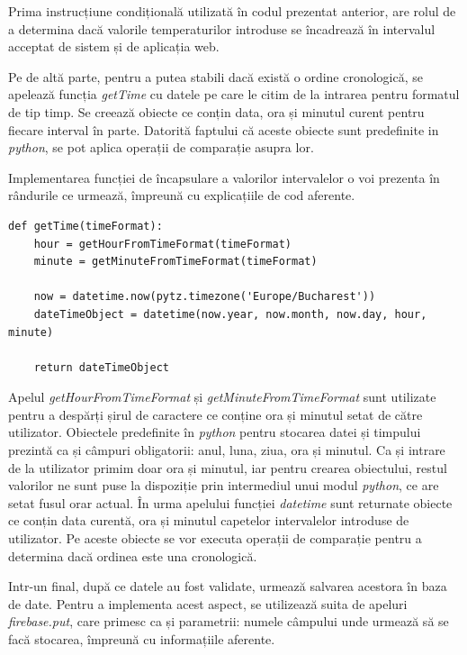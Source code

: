 	Prima instrucțiune condițională utilizată în codul prezentat anterior, are rolul de a determina dacă valorile temperaturilor introduse se încadrează în intervalul acceptat de sistem și de aplicația web.  

	Pe de altă parte, pentru a putea stabili dacă există o ordine cronologică, se apelează funcția \textit{getTime} cu datele pe care le citim de la intrarea pentru formatul de tip timp. Se creează obiecte ce conțin data, ora și minutul curent pentru fiecare interval în parte. Datorită faptului că aceste obiecte sunt predefinite in \textit{python}, se pot aplica operații de comparație asupra lor. 

	Implementarea funcției de încapsulare a valorilor intervalelor o voi prezenta în rândurile ce urmează, împreună cu explicațiile de cod aferente. 

\vspace{1em}
\begin{lstlisting}
def getTime(timeFormat):
    hour = getHourFromTimeFormat(timeFormat)
    minute = getMinuteFromTimeFormat(timeFormat)

    now = datetime.now(pytz.timezone('Europe/Bucharest'))
    dateTimeObject = datetime(now.year, now.month, now.day, hour, minute)

    return dateTimeObject
\end{lstlisting}
\vspace{2em} 

	Apelul \textit{getHourFromTimeFormat} și \textit{getMinuteFromTimeFormat} sunt utilizate pentru a despărți șirul de caractere ce conține ora și minutul setat de către utilizator. Obiectele predefinite în \textit{python} pentru stocarea datei și timpului prezintă ca și câmpuri obligatorii: anul, luna, ziua, ora și minutul. Ca și intrare de la utilizator primim doar ora și minutul, iar pentru crearea obiectului, restul valorilor ne sunt puse la dispoziție prin intermediul unui modul \textit{python}, ce are setat fusul orar actual. În urma apelului funcției \textit{datetime} sunt returnate obiecte ce conțin data curentă, ora și minutul capetelor intervalelor introduse de utilizator. Pe aceste obiecte se vor executa operații de comparație pentru a determina dacă ordinea este una cronologică.

	Intr-un final, după ce datele au fost validate, urmează salvarea acestora în baza de date. Pentru a implementa acest aspect, se utilizează suita de apeluri \textit{firebase.put}, care primesc ca și parametrii: numele câmpului unde urmează să se facă stocarea, împreună cu informațiile aferente.


